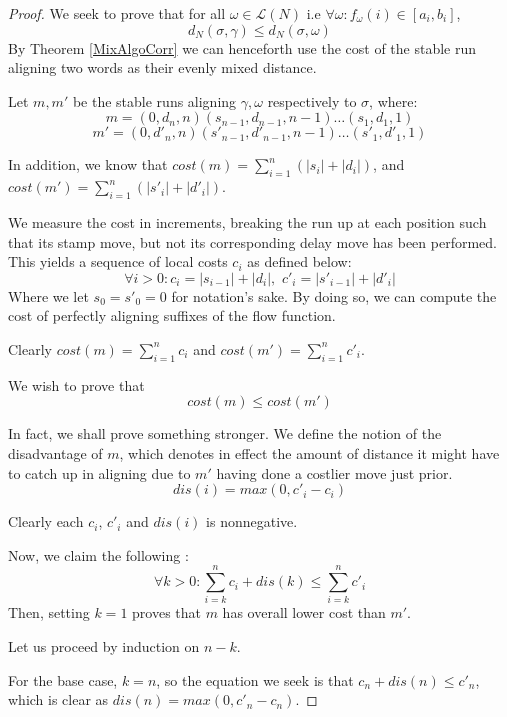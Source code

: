 \documentclass[runningheads]{llncs}
\begin{document}
\begin{proof}
    
  \color{firstrevision}We seek to prove that for all $\omega \in \mathcal{L}(N)$ i.e $\forall \omega : f_{\omega}(i) \in [a_i, b_i]$, $$d_N(\sigma, \gamma) \leq d_N(\sigma, \omega)$$\color{black}
    By Theorem \ref{MixAlgoCorr} we can henceforth use the cost of the stable run aligning two words as their evenly mixed distance. 
    
    Let $m, m'$ be the stable runs aligning $\gamma, \omega$ respectively to $\sigma$, where: 
    $$m = (0, d_n, n)(s_{n-1}, d_{n-1}, n-1) \dots (s_1, d_1, 1)$$  
    $$m' = (0, d'_n, n)(s'_{n-1}, d'_{n-1}, n-1) \dots (s'_1, d'_1, 1)$$ 
    
    In addition, we know that $cost(m) = \sum_{i = 1}^{n} (|s_i| + |d_i|)$, and $cost(m') = \sum_{i = 1}^{n} (|s'_i| + |d'_i|)$. 
    
    \color{firstrevision}
    We measure the cost in increments, breaking the run up at each position such that its stamp move, but not its corresponding delay move has been performed. This yields a sequence of local costs $c_i$ as defined below: $$\forall i > 0 : c_i = |s_{i-1}| + |d_i|,\,\,  c'_i = |s'_{i-1}| + |d'_i|$$ Where we let $s_0 = s'_0 = 0$ for notation's sake. 
    By doing so, we can compute the cost of perfectly aligning suffixes of the flow function. 
    
    Clearly $cost(m) = \sum_{i = 1}^{n} c_i$ and $cost(m') = \sum_{i = 1}^{n} c'_i$.
    \color{black}
    
    We wish to prove that $$cost(m) \leq cost(m')$$ 
    
    In fact, we shall prove something stronger. 
    We define the notion of the disadvantage of $m$, which denotes in effect the amount of distance it might have to catch up in aligning due to $m'$ having done a costlier move just prior. $$dis(i) = max(0, c'_i - c_i)$$
    
    Clearly each $c_i$, $c'_i$ and $dis(i)$ is nonnegative. 
    
    Now, we claim the following : $$\forall k > 0 : \sum_{i = k}^{n} c_i + dis(k) \leq \sum_{i=k}^{n} c'_i$$
   Then, setting $k=1$ proves that $m$ has overall lower cost than $m'$. 
    
    Let us proceed by induction on $n-k$. 
    
    For the base case, $k = n$, so the equation we seek is that $c_n + dis(n) \leq c'_n$, which is clear as $dis(n) = max(0, c'_n - c_n)$. 
    

\end{proof}
\end{document}
